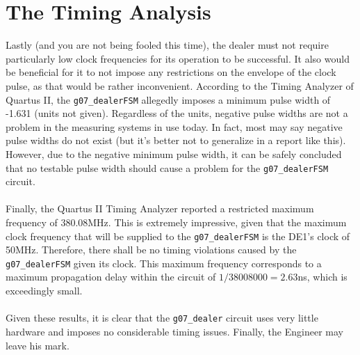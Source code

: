\documentclass[12pt]{report}
\begin{document}
\section*{The Timing Analysis}
Lastly (and you are not being fooled this time), the dealer must not require particularly low clock
frequencies for its operation to be successful. It also would be beneficial for it to not impose any
restrictions on the envelope of the clock pulse, as that would be rather inconvenient. According to
the Timing Analyzer of Quartus II, the \texttt{g07\_dealerFSM} allegedly imposes a minimum pulse
width of -1.631 (units not given). Regardless of the units, negative pulse widths are not a problem
in the measuring systems in use today. In fact, most may say negative pulse widths do not exist (but
it's better not to generalize in a report like this). However, due to the negative minimum pulse
width, it can be safely concluded that no testable pulse width should cause a problem for the
\texttt{g07\_dealerFSM} circuit.\\\\
Finally, the Quartus II Timing Analyzer reported a restricted maximum frequency of 380.08MHz. This
is extremely impressive, given that the maximum clock frequency that will be supplied to the
\texttt{g07\_dealerFSM} is the DE1's clock of 50MHz. Therefore, there shall be no timing violations
caused by the \texttt{g07\_dealerFSM} given its clock. This maximum frequency corresponds to a
maximum propagation delay within the circuit of $1/38008000 = 2.63$ns, which is exceedingly
small.\\\\
Given these results, it is clear that the \texttt{g07\_dealer} circuit uses very little hardware and
imposes no considerable timing issues. Finally, the Engineer may leave his mark.
\end{document}
